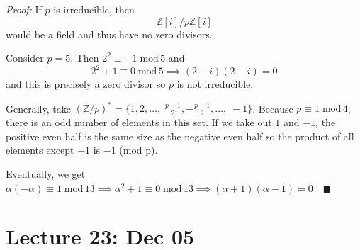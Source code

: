 \documentclass[12pt]{report}
\newcommand{\qed}{\quad \blacksquare}
\newcommand{\Z}{\mathbb{Z}}
\renewcommand{\mod}{\; \text{mod}\, }
\newenvironment*{tbox}[3][breakable]{
    \begin{tcolorbox}[
        parbox=false,
        colback=#2!5!white,
        colframe=#2!75!black,
        title={#3},
        #1
    ]}
    {\end{tcolorbox}}
\begin{document}
        \begin{tbox}{gray}{\textbf{Theorem:} if $p \in \Z$ is prime and $p \equiv 1 \mod 4$, then $p = a^2 + b^2$}
            \emph{Proof:} If $p$ is irreducible, then 
            \[\Z[i]/p\Z[i]\]
            would be a field and thus have no zero divisors.    
            
            Consider $p = 5$. Then $2^2 \equiv -1 \mod 5$ and 
            \[2^2 + 1 \equiv 0 \mod 5 \implies (2 + i)(2 - i) = 0\]
            and this is precisely a zero divisor so $p$ is not irreducible. 

            Generally, take $(\Z/p)^* = \{1, 2, \dots,\; \frac{p-1}{2}, - \frac{p-1}{2}, \dots, \; -1\}$. Because $p \equiv 1 \mod 4$, there is an odd number of elements in this set. If we take out $1$ and $-1$, the positive even half is the same size as the negative even half so the product of all elements except $\pm 1$ is $-1$ (mod p). 

            Eventually, we get $\alpha (-\alpha) \equiv 1 \mod 13 \implies \alpha^2 + 1 \equiv 0 \mod 13 \implies (\alpha + 1)(\alpha - 1) = 0 \qed$ 
        \end{tbox}

\section*{Lecture 23: Dec 05}
\end{document}
